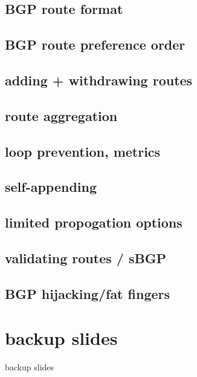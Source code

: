 \subsection{BGP route format}


\subsection{BGP route preference order}


\subsection{adding + withdrawing routes}

\subsection{route aggregation}

\subsection{loop prevention, metrics}

\subsection{self-appending}

\subsection{limited propogation options}

\subsection{validating routes / sBGP}

\subsection{BGP hijacking/fat fingers}



\section{backup slides}
\begin{frame}{backup slides}
\end{frame}


